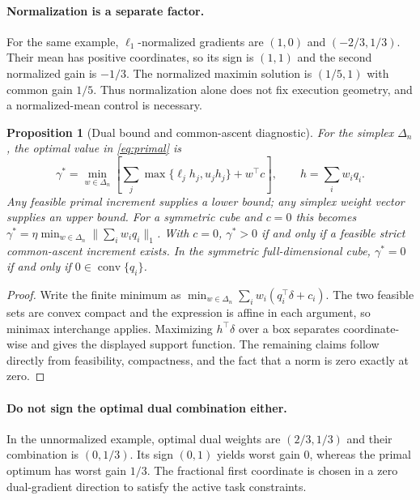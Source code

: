 \documentclass[10pt]{article}
\newtheorem{proposition}{Proposition}
\begin{document}
\paragraph{Normalization is a separate factor.}
For the same example, $\ell_1$-normalized gradients are
$(1,0)$ and $(-2/3,1/3)$. Their mean has positive coordinates, so its sign is
$(1,1)$ and the second normalized gain is $-1/3$. The normalized maximin
solution is $(1/5,1)$ with common gain $1/5$. Thus normalization alone does
not fix execution geometry, and a normalized-mean control is necessary.

\begin{proposition}[Dual bound and common-ascent diagnostic]\label{prop:dual}
For the simplex $\Delta_n$, the optimal value in \eqref{eq:primal} is
\[
 \gamma^*=\min_{w\in\Delta_n}\left[
 \sum_j\max\{\ell_j h_j,u_j h_j\}+w^\top c\right],\qquad
 h=\sum_iw_iq_i.
\]
Any feasible primal increment supplies a lower bound; any simplex weight vector
supplies an upper bound. For a symmetric cube and $c=0$ this becomes
$\gamma^*=\eta\min_{w\in\Delta_n}\|\sum_iw_iq_i\|_1$.
With $c=0$, $\gamma^*>0$ if and only if a feasible strict common-ascent increment
exists. In the symmetric full-dimensional cube, $\gamma^*=0$ if and only if
$0\in\operatorname{conv}\{q_i\}$.
\end{proposition}
\begin{proof}
Write the finite minimum as $\min_{w\in\Delta_n}\sum_iw_i(q_i^\top\delta+c_i)$.
The two feasible sets are convex compact and the expression is affine in each
argument, so minimax interchange applies. Maximizing $h^\top\delta$ over a
box separates coordinate-wise and gives the displayed support function.
The remaining claims follow directly from feasibility, compactness, and the
fact that a norm is zero exactly at zero.
\end{proof}

\paragraph{Do not sign the optimal dual combination either.}
In the unnormalized example, optimal dual weights are $(2/3,1/3)$ and their
combination is $(0,1/3)$. Its sign $(0,1)$ yields worst gain $0$, whereas
the primal optimum has worst gain $1/3$. The fractional first coordinate is
chosen in a zero dual-gradient direction to satisfy the active task constraints.
\end{document}
